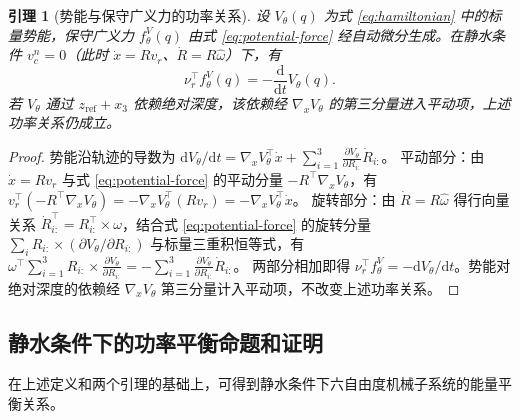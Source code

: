 \documentclass[UTF8,zihao=-4]{ctexrep}
\newtheorem{lemma}{引理}[chapter]
\newcommand{\dd}{\mathrm{d}}
\begin{document}
\begin{lemma}[势能与保守广义力的功率关系]
  \label{lem:potential-power-pairing}
  设 \(V_\theta(q)\) 为式 \eqref{eq:hamiltonian} 中的标量势能，保守广义力 \(f_\theta^V(q)\) 由式 \eqref{eq:potential-force} 经自动微分生成。在静水条件 \(v_c^n=0\)（此时 \(\dot x=Rv_r\)、\(\dot R=R\widehat\omega\)）下，有
  \begin{equation}
    \nu_r^\top f_\theta^{V}(q)
    =
    -\frac{\dd}{\dd t}V_\theta(q).
    \label{eq:potential-power-pairing}
  \end{equation}
  若 \(V_\theta\) 通过 \(z_{\mathrm{ref}}+x_3\) 依赖绝对深度，该依赖经 \(\nabla_x V_\theta\) 的第三分量进入平动项，上述功率关系仍成立。
\end{lemma}
\begin{proof}
  势能沿轨迹的导数为
  \(\dd V_\theta/\dd t=\nabla_x V_\theta^\top\dot x+\sum_{i=1}^{3}\frac{\partial V_\theta}{\partial R_{i:}}\dot R_{i:}\)。
  平动部分：由 \(\dot x=Rv_r\) 与式 \eqref{eq:potential-force} 的平动分量 \(-R^\top\nabla_x V_\theta\)，有
  \(v_r^\top(-R^\top\nabla_x V_\theta)=-\nabla_x V_\theta^\top(Rv_r)=-\nabla_x V_\theta^\top\dot x\)。
  旋转部分：由 \(\dot R=R\widehat\omega\) 得行向量关系 \(\dot R_{i:}^\top=R_{i:}^\top\times\omega\)，结合式 \eqref{eq:potential-force} 的旋转分量 \(\sum_i R_{i:}\times(\partial V_\theta/\partial R_{i:})\) 与标量三重积恒等式，有
  \(\omega^\top\sum_{i=1}^{3} R_{i:}\times\frac{\partial V_\theta}{\partial R_{i:}}=-\sum_{i=1}^{3}\frac{\partial V_\theta}{\partial R_{i:}}\dot R_{i:}\)。
  两部分相加即得 \(\nu_r^\top f_\theta^V=-\dd V_\theta/\dd t\)。势能对绝对深度的依赖经 \(\nabla_x V_\theta\) 第三分量计入平动项，不改变上述功率关系。
\end{proof}

\subsection{静水条件下的功率平衡命题和证明}

在上述定义和两个引理的基础上，可得到静水条件下六自由度机械子系统的能量平衡关系。
\end{document}
